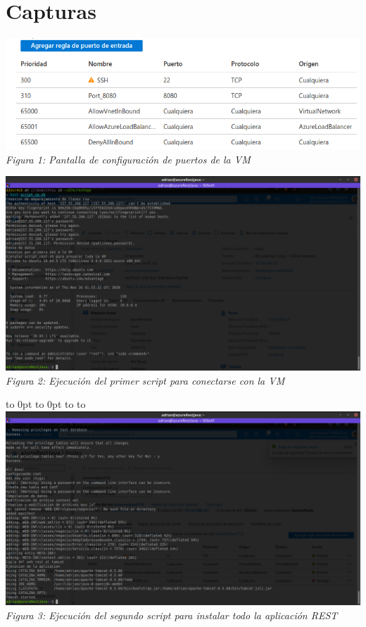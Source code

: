 \documentclass[10pt,executivepaper]{article}
\def\fillandplacepagenumber{%
 \par\pagestyle{empty}%
 \vbox to 0pt{\vss}\vfill
 \vbox to 0pt{\baselineskip0pt
   \hbox to\linewidth{\hss}%
   \baselineskip\footskip
   \hbox to\linewidth{%
     \hfil\thepage\hfil}\vss}}
\begin{document}
\section{Capturas}
\begin{center}
  \includegraphics[scale=0.45]{imgs/config_ports.png}
  \\\textit{Figura 1: Pantalla de configuración de puertos de la VM}
  \begin{landscape}
    \includegraphics[scale=0.5]{imgs/conexion.png}
    \\\textit{Figura 2: Ejecución del primer script para conectarse con la VM}
    \fillandplacepagenumber
    \includegraphics[scale=0.5]{imgs/script_install_rest.png}
    \\\textit{Figura 3: Ejecución del segundo script para instalar todo la aplicación REST}

\end{landscape}
\end{center}
\end{document}
